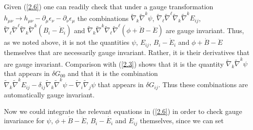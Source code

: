 \documentclass[aps,onecolumn,10pt]{revtex4}
\numberwithin{equation}{section}
\numberwithin{equation}{section}
\begin{document}
Given (\ref{2.6}) one can readily check that under a gauge transformation $h_{\mu\nu}\rightarrow h_{\mu\nu}-\partial_{\mu}\epsilon_{\nu}-\partial_{\nu}\epsilon_{\mu}$ the combinations  $\tilde{\nabla}_k\tilde{\nabla}^k\psi $, $\tilde{\nabla}_{\ell}\tilde{\nabla}^{\ell}\tilde{\nabla}_k\tilde{\nabla}^kE_{ij}$, $\tilde{\nabla}_{\ell}\tilde{\nabla}^{\ell}\tilde{\nabla}_k\tilde{\nabla}^k(B_i-\dot{E}_i)$ and $ \tilde{\nabla}_k\tilde{\nabla}^k\tilde{\nabla}_{\ell}\tilde{\nabla}^{\ell}(\phi+\dot{B}-\ddot{E})$ are gauge invariant. Thus, as we noted above, it is not the quantities $\psi$, $E_{ij}$, $B_i-\dot{E}_i$ and $\phi+\dot{B}-\ddot{E}$ themselves that are necessarily gauge invariant. Rather, it is their derivatives that are  gauge invariant. Comparison with (\ref{2.3}) shows that it is the quantity $\tilde{\nabla}_k\tilde{\nabla}^k\psi$ that appears in $\delta G_{00}$ and that it is the combination $ \tilde{\nabla}_k\tilde{\nabla}^kE_{ij}-\delta_{ij}\tilde{\nabla}_k\tilde{\nabla}^k\psi-\tilde{\nabla}_i\tilde{\nabla}_j\psi$ that appears in  $\delta G_{ij}$. Thus these  combinations are automatically gauge invariant.


Now we could integrate the relevant equations in (\ref{2.6}) in order to check gauge invariance for $\psi$, $\phi+\dot{B}-\ddot{E}$, $B_{i}-\dot{E_i}$ and $E_{ij}$ themselves, since we can set
\end{document}
